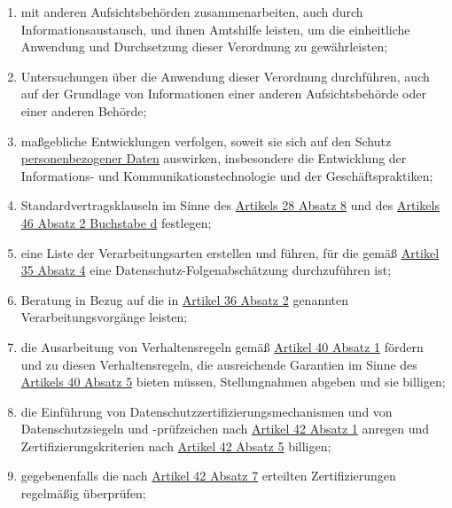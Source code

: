 \begin{enumerate}
\begin{enumerate}
    \item mit anderen Aufsichtsbehörden zusammenarbeiten, auch durch Informationsaustausch, und ihnen Amtshilfe leisten,
     um die einheitliche Anwendung und Durchsetzung dieser Verordnung zu gewährleisten;
    \label{itm:57-1g}

    \item Untersuchungen über die Anwendung dieser Verordnung durchführen, auch auf der Grundlage von Informationen
     einer anderen Aufsichtsbehörde oder einer anderen Behörde;
    \label{itm:57-1h}

    \item maßgebliche Entwicklungen verfolgen, soweit sie sich auf den Schutz \hyperref[itm:04-1]{personenbezogener Daten} auswirken,
     insbesondere die Entwicklung der Informations- und Kommunikationstechnologie und der Geschäftspraktiken;
    \label{itm:57-1i}

    \item Standardvertragsklauseln im Sinne des \hyperref[itm:28-8]{Artikels 28 Absatz 8} und des \hyperref[itm:46-2d]
     {Artikels 46 Absatz 2 Buchstabe d} festlegen;
    \label{itm:57-1j}

    \item eine Liste der Verarbeitungsarten erstellen und führen, für die gemäß \hyperref[itm:35-4]{Artikel 35 Absatz 4}
     eine Datenschutz-Folgenabschätzung durchzuführen ist;
    \label{itm:57-1k}

    \item Beratung in Bezug auf die in \hyperref[itm:36-1]{Artikel 36 Absatz 2} genannten Verarbeitungsvorgänge leisten;
    \label{itm:57-1l}

    \item die Ausarbeitung von Verhaltensregeln gemäß \hyperref[itm:40-1]{Artikel 40 Absatz 1} fördern und zu diesen
     Verhaltensregeln, die ausreichende Garantien im Sinne des \hyperref[itm:40-5]{Artikels 40 Absatz 5} bieten müssen,
     Stellungnahmen abgeben und sie billigen;
    \label{itm:57-1m}

    \item die Einführung von Datenschutzzertifizierungsmechanismen und von Datenschutzsiegeln und -prüfzeichen nach
     \hyperref[itm:42-1]{Artikel 42 Absatz 1} anregen und Zertifizierungskriterien nach \hyperref[itm:42-5]{Artikel 42
      Absatz 5} billigen;
    \label{itm:57-1n}

    \item gegebenenfalls die nach \hyperref[itm:42-7]{Artikel 42 Absatz 7} erteilten Zertifizierungen regelmäßig
     überprüfen;
    \label{itm:57-1o}


\end{enumerate}
\end{enumerate}
